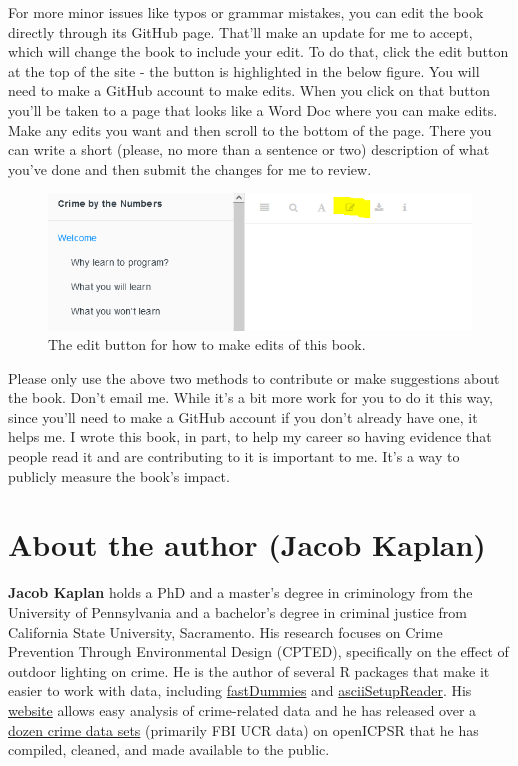 \documentclass[
  12pt,
  openany]{book}
\begin{document}
For more minor issues like typos or grammar mistakes, you can edit the book directly through its GitHub page. That'll make an update for me to accept, which will change the book to include your edit. To do that, click the edit button at the top of the site - the button is highlighted in the below figure. You will need to make a GitHub account to make edits. When you click on that button you'll be taken to a page that looks like a Word Doc where you can make edits. Make any edits you want and then scroll to the bottom of the page. There you can write a short (please, no more than a sentence or two) description of what you've done and then submit the changes for me to review.

\begin{figure}

{\centering \includegraphics[width=0.9\linewidth]{images/edit_button} 

}

\caption{The edit button for how to make edits of this book.}\label{fig:unnamed-chunk-2}
\end{figure}

Please only use the above two methods to contribute or make suggestions about the book. Don't email me. While it's a bit more work for you to do it this way, since you'll need to make a GitHub account if you don't already have one, it helps me. I wrote this book, in part, to help my career so having evidence that people read it and are contributing to it is important to me. It's a way to publicly measure the book's impact.

\hypertarget{about-the-author-jacob-kaplan}{%
\chapter*{About the author (Jacob Kaplan)}\label{about-the-author-jacob-kaplan}}


\textbf{Jacob Kaplan} holds a PhD and a master's degree in criminology from the University of Pennsylvania and a bachelor's degree in criminal justice from California State University, Sacramento. His research focuses on Crime Prevention Through Environmental Design (CPTED), specifically on the effect of outdoor lighting on crime. He is the author of several R packages that make it easier to work with data, including \href{https://jacobkap.github.io/fastDummies/}{fastDummies} and \href{https://jacobkap.github.io/asciiSetupReader/}{asciiSetupReader}. His \href{http://jacobdkaplan.com/}{website} allows easy analysis of crime-related data and he has released over a \href{http://jacobdkaplan.com/data.html}{dozen crime data sets} (primarily FBI UCR data) on openICPSR that he has compiled, cleaned, and made available to the public.
\end{document}
